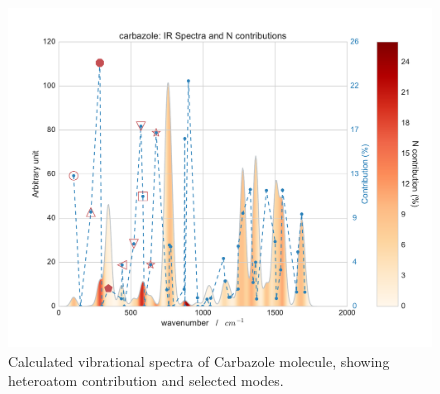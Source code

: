 	 
	\begin{figure}[H]
		\begin{center}
			\includegraphics[scale=0.55]{image/P2-6}
		\end{center}
		\caption{Calculated vibrational spectra of Carbazole molecule, showing heteroatom contribution and selected modes.}  \label{figP2-6}
	\end{figure}
	

	
	
